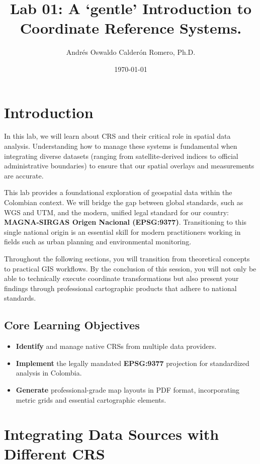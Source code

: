 \documentclass{article}
\title{Lab 01: A `gentle' Introduction to Coordinate Reference Systems.}
\author{Andrés Oswaldo Calderón Romero, Ph.D.}
\date{\today}
\begin{document}
\maketitle

\section{Introduction} \label{sec:intro}

In this lab, we will learn about \ac{CRS} and their critical role in spatial data analysis. Understanding how to manage these systems is fundamental when integrating diverse datasets (ranging from satellite-derived indices to official administrative boundaries) to ensure that our spatial overlays and measurements are accurate.

This lab provides a foundational exploration of geospatial data within the Colombian context. We will bridge the gap between global standards, such as \ac{WGS} and \ac{UTM}, and the modern, unified legal standard for our country: \textbf{\acs{MAGNA}-\acs{SIRGAS} Origen Nacional (\acs{EPSG}:9377)}. Transitioning to this single national origin is an essential skill for modern practitioners working in fields such as urban planning and environmental monitoring.

Throughout the following sections, you will transition from theoretical concepts to practical \ac{GIS} workflows. By the conclusion of this session, you will not only be able to technically execute coordinate transformations but also present your findings through professional cartographic products that adhere to national standards.

\subsection*{Core Learning Objectives}
\begin{itemize}
    \item \textbf{Identify} and manage native \acp{CRS} from multiple data providers.
    \item \textbf{Implement} the legally mandated \textbf{EPSG:9377} projection for standardized analysis in Colombia.
    \item \textbf{Generate} professional-grade map layouts in PDF format, incorporating metric grids and essential cartographic elements.
\end{itemize}

\section{Integrating Data Sources with Different \acs{CRS}} \label{sec:datasources}
\end{document}
